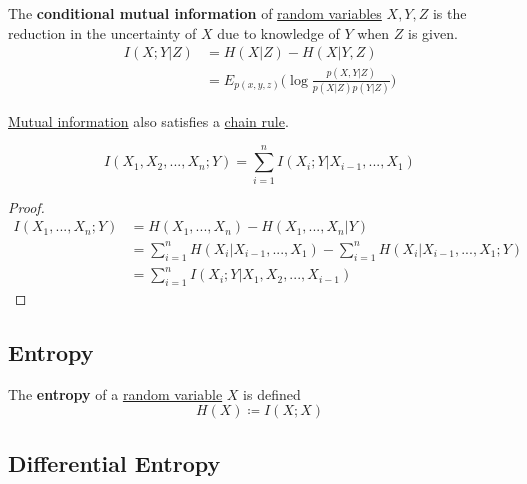   \begin{definition}
    \label{def:conditional-mutual-information}
    The \textbf{conditional mutual information} of \hyperref[prob-def:random-variable]{random variables} $X, Y, Z$ is the reduction in the uncertainty of $X$ due to knowledge of $Y$ when $Z$ is given. 
    \begin{align*}
      I(X;Y|Z) & = H(X|Z) - H(X|Y, Z) \\
      & = E_{p(x, y, z)} \bigg( \log \frac{p(X, Y|Z)}{p(X|Z) p(Y|Z)}\bigg)
    \end{align*}
  \end{definition}

  \hyperref[def:mutual-information]{Mutual information} also satisfies a \hyperref[mv-thm:chain-rule]{chain rule}. 

  \begin{theorem}
    \label{thm:chain-rule-for-information}
    \begin{equation}
      I(X_1, X_2, ..., X_n; Y) = \sum_{i=1}^n I(X_i;Y|X_{i-1}, ..., X_1)
    \end{equation}
  \end{theorem}
  \begin{proof}
    \begin{align*}
      I(X_1, ..., X_n;Y) & = H(X_1, ..., X_n) - H(X_1, ..., X_n |Y) \\
      & = \sum_{i=1}^n H(X_i|X_{i-1}, ..., X_1) - \sum_{i=1}^n H(X_i | X_{i-1}, ..., X_1;Y) \\
      & = \sum_{i=1}^n I(X_i ; Y|X_1, X_2, ..., X_{i-1})
    \end{align*}
  \end{proof}

\subsection{Entropy}

  \begin{definition}[Entropy]
    \label{def:entropy}
    The \textbf{entropy} of a \hyperref[prob-def:random-variable]{random variable} $X$ is defined 
    \begin{equation}
      H(X) \coloneqq I(X; X)
    \end{equation}
  \end{definition}


\subsection{Differential Entropy} 


